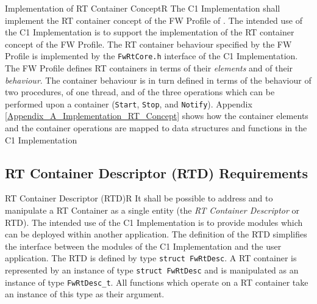 \documentclass[requirements]{../fwprofile}
\begin{document}

\begin{fw_req}{Implementation of RT Container Concept}{R}
{The C1 Implementation shall implement the RT container concept of the FW Profile of \cite{ref:fwprofile}.}
{The intended use of the C1 Implementation is to support the implementation of the RT container concept of the FW Profile.}
{The RT container behaviour specified by the FW Profile is implemented by the \texttt{FwRtCore.h} interface of the C1 Implementation.} 
{The FW Profile defines RT containers in terms of their \emph{elements} 
and of their \emph{behaviour}. The container behaviour is in turn defined in terms of the behaviour of two procedures, of one thread, and of the three operations which can be performed upon a container (\texttt{Start}, \texttt{Stop}, and \texttt{Notify}). Appendix \ref{Appendix_A_Implementation_RT_Concept} shows how the container elements and the container operations are mapped to data structures and functions in the C1 Implementation}
\end{fw_req}


\subsection{RT Container Descriptor (RTD) Requirements}\label{req:RTD}

\begin{fw_req}{RT Container Descriptor (RTD)}{R}
{It shall be possible to address and to manipulate a RT Container as a single entity (the \emph{RT Container Descriptor} or RTD).}
{The intended use of the C1 Implementation is to provide modules which can be deployed within another application. The definition of the RTD simplifies the interface between the modules of the C1 Implementation and the user application.}
{The RTD is defined by type \texttt{struct FwRtDesc}.} 
{A RT container is represented by an instance of type \texttt{struct FwRtDesc} and is manipulated as an instance of type \texttt{FwRtDesc\_t}. All functions which operate on a RT container take an instance of this type as their argument.}
\end{fw_req}
\end{document}
